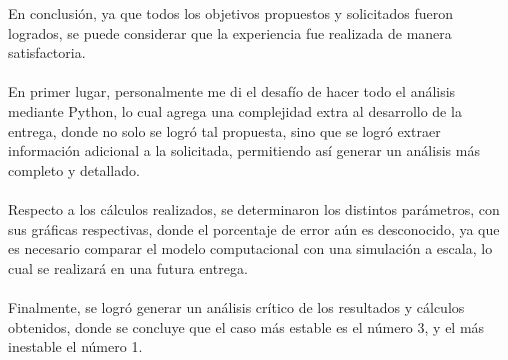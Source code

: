 En conclusión, ya que todos los objetivos propuestos y solicitados fueron logrados, se puede considerar que la experiencia fue realizada de manera satisfactoria.
\\ \\
En primer lugar, personalmente me di el desafío de hacer todo el análisis mediante Python, lo cual agrega una complejidad extra al desarrollo de la entrega, donde no solo se logró tal propuesta, sino que se logró extraer información adicional a la solicitada, permitiendo así generar un análisis más completo y detallado.
\\ \\
Respecto a los cálculos realizados, se determinaron los distintos parámetros, con sus gráficas respectivas, donde el porcentaje de error aún es desconocido, ya que es necesario comparar el modelo computacional con una simulación a escala, lo cual se realizará en una futura entrega.
\\ \\
Finalmente, se logró generar un análisis crítico de los resultados y cálculos obtenidos, donde se concluye que el caso más estable es el número 3, y el más inestable el número 1.
